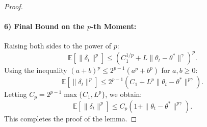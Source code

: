 \begin{proof}
\paragraph{6) Final Bound on the \( p \)-th Moment:}  
Raising both sides to the power of \( p \):
\[
\mathbb{E}\left[\|\delta_t\|^p\right] \leq \left( C_1^{1/p} + L \|\theta_t - \theta^*\|^{\gamma} \right)^p.
\]
Using the inequality \( (a + b)^p \leq 2^{p-1}(a^p + b^p) \) for \( a, b \geq 0 \):
\[
\mathbb{E}\left[\|\delta_t\|^p\right] \leq 2^{p-1} \left( C_1 + L^p \|\theta_t - \theta^*\|^{p\gamma} \right).
\]
Letting \( C_p = 2^{p-1} \max\{C_1, L^p\} \), we obtain:
\[
\mathbb{E}\left[\|\delta_t\|^p\right] \leq C_p \left( 1 + \|\theta_t - \theta^*\|^{p\gamma} \right).
\]
This completes the proof of the lemma.
\end{proof}